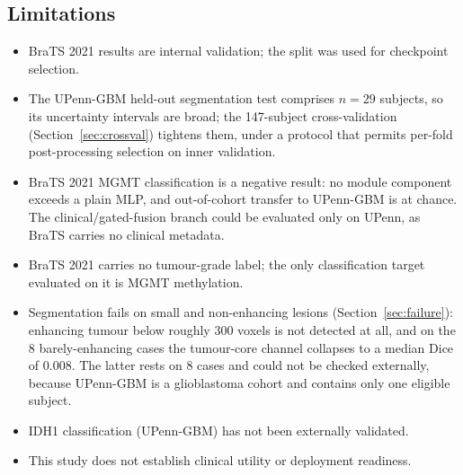 \documentclass[conference]{IEEEtran}
\begin{document}
\subsection{Limitations}
\begin{itemize}
    \item BraTS 2021 results are internal validation; the split was used for checkpoint selection.
    \item The UPenn-GBM held-out segmentation test comprises $n=29$ subjects, so its uncertainty intervals are broad; the 147-subject cross-validation (Section~\ref{sec:crossval}) tightens them, under a protocol that permits per-fold post-processing selection on inner validation.
    \item BraTS 2021 MGMT classification is a negative result: no module component exceeds a plain MLP, and out-of-cohort transfer to UPenn-GBM is at chance. The clinical/gated-fusion branch could be evaluated only on UPenn, as BraTS carries no clinical metadata.
    \item BraTS 2021 carries no tumour-grade label; the only classification target evaluated on it is MGMT methylation.
    \item Segmentation fails on small and non-enhancing lesions (Section~\ref{sec:failure}): enhancing tumour below roughly 300 voxels is not detected at all, and on the 8 barely-enhancing cases the tumour-core channel collapses to a median Dice of 0.008. The latter rests on 8 cases and could not be checked externally, because UPenn-GBM is a glioblastoma cohort and contains only one eligible subject.
    \item IDH1 classification (UPenn-GBM) has not been externally validated.
    \item This study does not establish clinical utility or deployment readiness.
\end{itemize}
\end{document}
